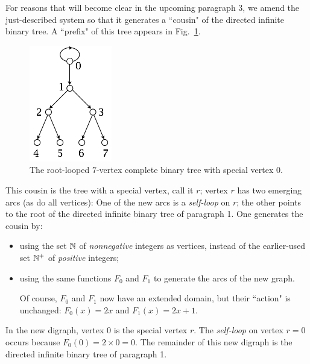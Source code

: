 For reasons that will become clear in the upcoming paragraph 3, we amend the just-described
system so that it generates a ``cousin" of the directed infinite binary tree.  A ``prefix" of this tree appears in Fig.~\ref{fig:TreeLabelling}.
\begin{figure}[hbt]
\begin{center}
       \includegraphics[scale=0.5]{FiguresGraph/TreeLabelling}
\caption{The root-looped $7$-vertex complete binary tree with special vertex $0$.}
\label{fig:TreeLabelling}
\end{center}
\end{figure}
This cousin is the tree with a special vertex, call it $r$; vertex $r$ has two emerging arcs (as do all vertices): One of the new arcs is a {\em self-loop} on $r$; the other points to the root of the directed infinite binary tree of paragraph 1.  One generates the cousin by:
\begin{itemize}
\item
using the set $\mathbb{N}$ of {\em nonnegative} integers as vertices, instead of the earlier-used set $\mathbb{N}^+$ of {\em positive} integers;
\medskip\item
using the same functions $F_0$ and $F_1$ to generate the arcs of the new graph.

\smallskip

Of course, $F_0$ and $F_1$ now have an extended domain, but their ``action" is unchanged: $F_0(x) = 2x$ and $F_1(x) = 2x+1$.
\end{itemize}
In the new digraph, vertex $0$ is the special vertex $r$.  The {\em self-loop} on vertex $r=0$ occurs because $F_0(0) = 2 \times 0 = 0$.  The remainder of this new digraph is the directed infinite binary tree of paragraph 1.

\bigskip

